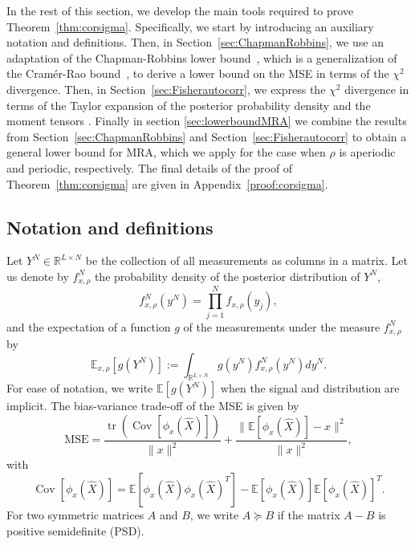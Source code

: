 \documentclass{IEEEtran}
\numberwithin{equation}{section}
\numberwithin{figure}{section}
\theoremstyle{plain}
\theoremstyle{definition}
\theoremstyle{remark}
\theoremstyle{plain}
\theoremstyle{remark}
\theoremstyle{plain}
\theoremstyle{plain}
\theoremstyle{remark}
\newcommand{\reals}{\mathbb{R}}
\newcommand{\E}{\mathbb{E}}
\DeclareMathOperator*{\tr}{tr}
\DeclareMathOperator*{\Cov}{Cov}
\newcommand{\MSE}{\mathrm{MSE}}
\begin{document}
In the rest of this section, we develop the main tools required to prove Theorem~\ref{thm:corsigma}. Specifically, we start by introducing an auxiliary notation and definitions.
Then, in Section~\ref{sec:ChapmanRobbins}, we use an adaptation of the Chapman-Robbins lower bound~\cite{ChapRobb}, which is a generalization of the Cram\'er-Rao bound~\cite{CramerRao}, to derive a lower bound on the MSE in terms of the $\chi^2$ divergence. Then, in Section~\ref{sec:Fisherautocorr}, we express the $\chi^2$ divergence in terms of the Taylor expansion of the posterior probability density and the moment tensors . Finally in section \ref{sec:lowerboundMRA} we combine the results from Section~\ref{sec:ChapmanRobbins} and Section~\ref{sec:Fisherautocorr} to obtain a general lower bound for MRA, which we apply for the case when $\rho$ is aperiodic and periodic, respectively. The final details of the proof of Theorem~\ref{thm:corsigma} are given in Appendix~\ref{proof:corsigma}. 

\subsection{Notation and definitions}

Let $Y^{N}\in \reals^{L\times N}$ be the collection of all measurements as columns in a matrix. Let us denote by $f^{N}_{x,\rho}$ the probability density of the posterior distribution of $Y^{N}$, 
\begin{equation}\label{eq:parindepence}
f^{N}_{x,\rho}(y^N)=\prod_{j=1}^N f_{x,\rho}(y_j),
\end{equation} 
and the expectation of a function $g$ of the measurements under the measure $f^{N}_{x,\rho}$ by
\begin{equation*}
\E_{x,\rho}\left[g\left(Y^{N}\right)\right]:=\int_{\reals^{L\times N}} g\left(y^{N}\right) f^{N}_{x,\rho}\left(y^{N}\right)dy^{N}.
\end{equation*}
For ease of notation, we write $\E\left[g\left(Y^N\right)\right]$ when the signal and distribution are implicit. The bias-variance trade-off of the MSE is given by
\begin{equation}\label{eq:BiasVar}
\MSE=\frac{\tr(\Cov[\phi_x(\widehat X)])}{\|x\|^2}+
\frac{\|\E[\phi_{x}(\widehat X)]-x\|^2}{\|x\|^2},
\end{equation}
with
\begin{equation}\label{eq:Cov}
\Cov[\phi_x(\widehat X)]=\E\left[\phi_x(\widehat X)\phi_x(\widehat X)^T\right]-\E[\phi_{x}(\widehat X)]\E[\phi_{x}(\widehat X)]^T.
\end{equation}
For two symmetric matrices $A$ and $B$, we write $A\succeq B$ if the matrix $A-B$ is positive semidefinite (PSD).
\end{document}
